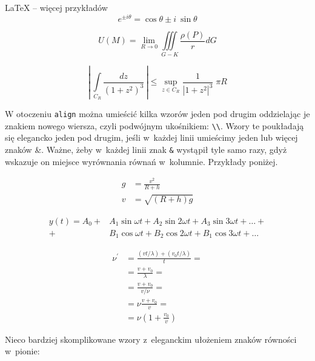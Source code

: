 \begin{easyappendix}{\LaTeX{} -- więcej przykładów}
\begin{equation}
	e^{\pm i\theta} = \cos \theta \pm i~\sin\theta
\end{equation}

\begin{equation}
	U(M) = \lim\limits_{R\to 0} \iiint\limits_{G-K}\frac{\rho(P)}{r}dG
\end{equation}

\begin{equation*}
	\left| \, \int\limits_{C_R} \frac{dz}{\left( 1+z^2 \right )^3} \, \right| \leqslant \sup\limits_{z \in C_R} \frac{1}{\left| 1+z^2 \right|^3} \; \pi R
\end{equation*}

W otoczeniu \texttt{align} można umieścić kilka wzorów jeden pod drugim oddzielając je znakiem nowego wiersza, czyli podwójnym ukośnikiem: \texttt{\textbackslash{}\textbackslash{}}. Wzory te poukładają się elegancko jeden pod drugim, jeśli w~każdej linii umieścimy jeden lub więcej znaków \&. Ważne, żeby w~każdej linii znak \texttt{\&} wystąpił tyle samo razy, gdyż wskazuje on miejsce wyrównania równań w~kolumnie. Przykłady poniżej.

\begin{align}
	g & = \frac{v^2}{R+h} \\
	v & = \sqrt{ \left( R+h \right) g }
\end{align}

\begin{align}
	y(t) = A_0 
	+& A_1 \sin \omega t + 
	A_2 \sin 2 \omega t + 
	A_3 \sin 3 \omega t + \ldots + \nonumber \\
	+& B_1 \cos \omega t + 
	B_2 \cos 2 \omega t + 
	B_1 \cos 3 \omega t + \ldots
\end{align}

\begin{align}
	\nu^\prime  &= \frac{\left(vt / \lambda \right) + \left( v_0t / \lambda \right)}{t} = \nonumber\\
	&= \frac{v + v_0}{\lambda} = \nonumber\\
	&= \frac{v + v_0}{v / \nu} = \nonumber\\
	&= \nu \frac{v+v_0}{v} = \nonumber\\
	&= \nu \left( 1 + \frac{v_0}{v} \right)
\end{align}

Nieco bardziej skomplikowane wzory z~eleganckim ułożeniem znaków równości w~pionie:


\end{easyappendix}
